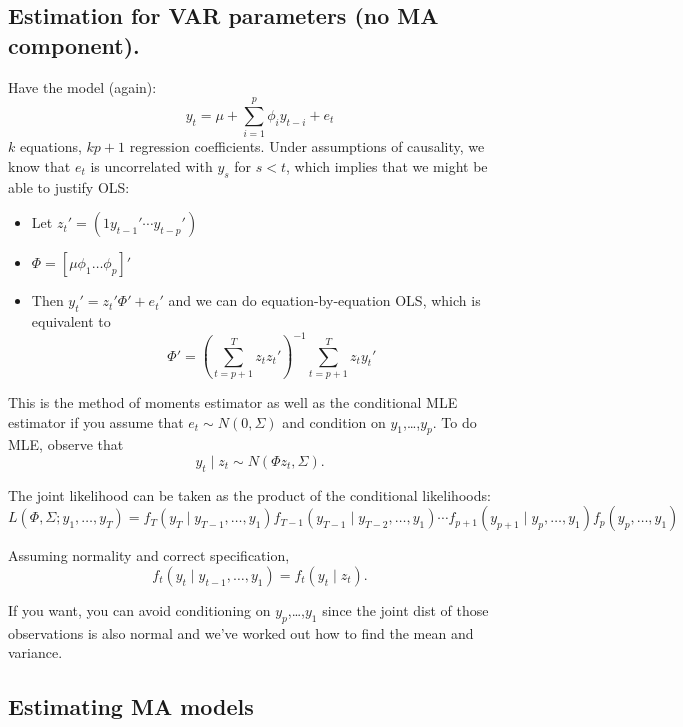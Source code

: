 \subsection{Estimation for VAR parameters (no MA component).}

Have the model (again):
\[y_t = \mu + \sum_{i=1}^p \phi_i y_{t-i} + e_t\] $k$ equations, $k p + 1$
regression coefficients. Under assumptions of causality, we know that
$e_t$ is uncorrelated with $y_s$ for $s < t$, which implies that we
might be able to justify OLS:
\begin{itemize}
\item Let $z_t' = (1 y_{t-1}' \cdots y_{t-p}')$
\item $\Phi = [ \mu \phi_1 \dots \phi_p ]'$
\item Then $y_t' = z_t'\Phi' + e_t'$ and we can do equation-by-equation
  OLS, which is equivalent to
  \[\hat \Phi' = (\sum_{t=p+1}^T z_t z_t')^{-1} \sum_{t=p+1}^T z_t y_t'\]
\end{itemize}

This is the method of moments estimator as well as the conditional MLE
estimator if you assume that $e_t ∼ N(0, \Sigma)$ and
condition on $y_1$,\dots,$y_p$. To do MLE, observe that
\[y_t ∣ z_t ∼ N(\Phi z_t, \Sigma).\]

The joint likelihood can be taken as the product of the conditional
likelihoods:
\[L(\Phi, \Sigma; y_1,\dots,y_T) = f_T(y_T ∣ y_{T-1},\dots, y_1) f_{T-1}(y_{T-1} ∣
y_{T-2},\dots, y_1) \cdots f_{p+1}(y_{p+1} ∣ y_p,\dots,y_1) f_p(y_p,\dots,y_1)\]

Assuming normality and correct specification,
\[f_t(y_t ∣ y_{t-1},\dots, y_1) = f_t(y_t ∣ z_t).\]

If you want, you can avoid conditioning on $y_p$,\dots,$y_1$ since the
joint dist of those observations is also normal and we've worked out
how to find the mean and variance.

\subsection{Estimating MA models}

